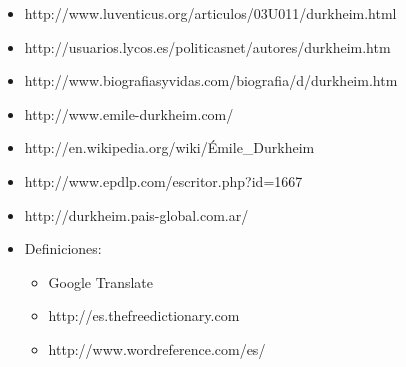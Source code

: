 \begin{itemize}
	\item http://www.luventicus.org/articulos/03U011/durkheim.html
	\item http://usuarios.lycos.es/politicasnet/autores/durkheim.htm
	\item http://www.biografiasyvidas.com/biografia/d/durkheim.htm
	\item http://www.emile-durkheim.com/
	\item http://en.wikipedia.org/wiki/Émile\_Durkheim
	\item http://www.epdlp.com/escritor.php?id=1667
	\item http://durkheim.pais-global.com.ar/
	\item Definiciones: 	
	\begin{itemize}
			\item Google Translate
			\item http://es.thefreedictionary.com
			\item http://www.wordreference.com/es/ 
	\end{itemize}
\end{itemize}
\newpage
